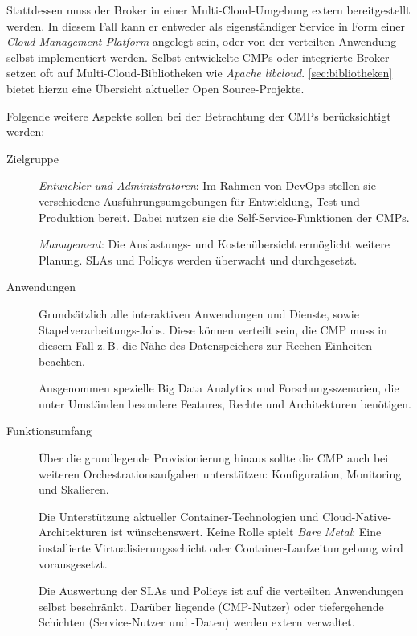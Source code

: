 Stattdessen muss der Broker in einer Multi-Cloud-Umgebung extern bereitgestellt werden. In diesem Fall kann er entweder als eigenständiger Service in Form einer \emph{Cloud Management Platform} angelegt sein, oder von der verteilten Anwendung selbst implementiert werden. Selbst entwickelte CMPs oder integrierte Broker setzen oft auf Multi-Cloud-Bibliotheken wie \emph{Apache libcloud}. \autoref{sec:bibliotheken} bietet hierzu eine Übersicht aktueller Open Source-Projekte. 

Folgende weitere Aspekte sollen bei der Betrachtung der CMPs berücksichtigt werden:

\begin{description}
	
	\item[Zielgruppe] 	\emph{Entwickler und Administratoren}: Im Rahmen von DevOps stellen sie verschiedene Ausführungsumgebungen für Entwicklung, Test und Produktion bereit. Dabei nutzen sie die Self-Service-Funktionen der CMPs.
	
						\emph{Management}: Die Auslastungs- und Kostenübersicht ermöglicht weitere Planung. SLAs und Policys werden überwacht und durchgesetzt.
	
	\item[Anwendungen] Grundsätzlich alle interaktiven Anwendungen und Dienste, sowie Stapelverarbeitungs-Jobs. Diese können verteilt sein, die CMP muss in diesem Fall z.\,B. die Nähe des Datenspeichers zur Rechen-Einheiten beachten.
	
	Ausgenommen spezielle Big Data Analytics und Forschungsszenarien, die unter Umständen besondere Features, Rechte und Architekturen benötigen.
	
	\item[Funktionsumfang] Über die grundlegende Provisionierung hinaus sollte die CMP auch bei weiteren Orchestrationsaufgaben unterstützen: Konfiguration, Monitoring und Skalieren.
	
	Die Unterstützung aktueller Container-Technologien und Cloud-Native-Architekturen ist wünschenswert. Keine Rolle spielt \emph{Bare Metal}: Eine installierte Virtualisierungsschicht oder Container-Laufzeitumgebung wird vorausgesetzt. 
	
	Die Auswertung der SLAs und Policys ist auf die verteilten Anwendungen selbst beschränkt. Darüber liegende (CMP-Nutzer) oder tiefergehende Schichten (Service-Nutzer und -Daten) werden extern verwaltet.
		
\end{description}



